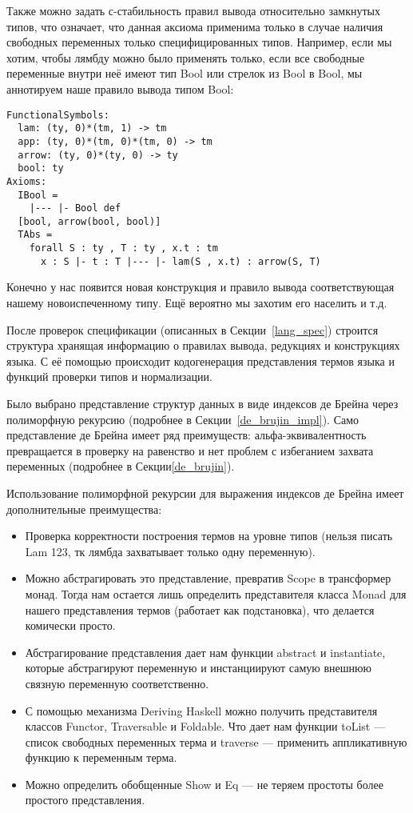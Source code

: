 Также можно задать с-стабильность правил вывода относительно замкнутых типов, что означает, что данная аксиома применима только в случае наличия свободных переменных только специфицированных типов. Например, если мы хотим, чтобы лямбду можно было применять только, если все свободные переменные внутри неё имеют тип Bool или стрелок из Bool в Bool, мы аннотируем наше правило вывода типом Bool:
\begin{lstlisting}[frame=single]
FunctionalSymbols:
  lam: (ty, 0)*(tm, 1) -> tm
  app: (ty, 0)*(tm, 0)*(tm, 0) -> tm
  arrow: (ty, 0)*(ty, 0) -> ty
  bool: ty
Axioms:
  IBool =
    |--- |- Bool def
  [bool, arrow(bool, bool)]
  TAbs =
    forall S : ty , T : ty , x.t : tm
      x : S |- t : T |--- |- lam(S , x.t) : arrow(S, T)
\end{lstlisting}

Конечно у нас появится новая конструкция и правило вывода соответствующая нашему новоиспеченному типу. Ещё вероятно мы захотим его населить и т.д.

\hfill

После проверок спецификации (описанных в Секции~\ref{lang_spec}) строится структура хранящая информацию о правилах вывода, редукциях и конструкциях языка. С её помощью происходит кодогенерация представления термов языка и функций проверки типов и нормализации.

Было выбрано представление структур данных в виде индексов де Брейна через полиморфную рекурсию (подробнее в Секции~\ref{de_brujin_impl}). Само представление де Брейна имеет ряд преимуществ: альфа-эквивалентность превращается в проверку на равенство и нет проблем с избеганием захвата переменных (подробнее в Секции\ref{de_brujin}).

Использование полиморфной рекурсии для выражения индексов де Брейна имеет дополнительные преимущества:
\begin{itemize}
  \item Проверка корректности построения термов на уровне типов (нельзя писать Lam 123, тк лямбда захватывает только одну переменную).
  \item Можно абстрагировать это представление, превратив Scope в трансформер монад. Тогда нам остается лишь определить представителя класса Monad для нашего представления термов (работает как подстановка), что делается комически просто.
  \item Абстрагирование представления дает нам функции abstract и instantiate, которые абстрагируют переменную и инстанциируют самую внешнюю связную переменную соответственно.
  \item С помощью механизма Deriving Haskell можно получить представителя классов Functor, Traversable и Foldable. Что дает нам функции toList --- список свободных переменных терма и traverse --- применить аппликативную функцию к переменным терма.
  \item Можно определить обобщенные Show и Eq --- не теряем простоты более простого представления.
\end{itemize}

